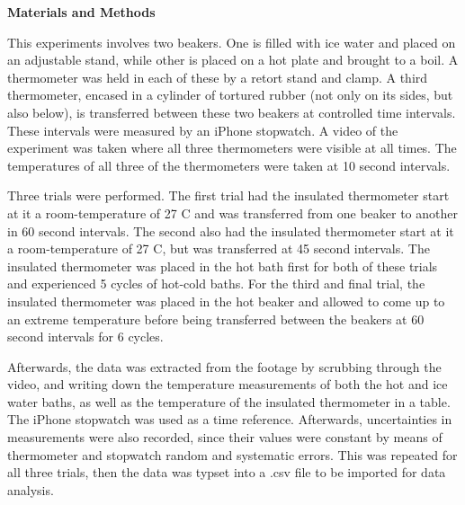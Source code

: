 \documentclass[11pt]{article}
\begin{document}
\begin{multicols}{2}
    \vspace{20pt}

     \selectfont \textbf{Materials and Methods}
    
     \selectfont 


    This experiments involves two beakers. One is filled with ice water and placed on an adjustable stand, while other is placed on a hot plate and brought to a boil. A thermometer was held in each of these by a retort stand and clamp. A third thermometer, encased in a cylinder of tortured rubber (not only on its sides, but also below), is transferred between these two beakers at controlled time intervals. These intervals were measured by an iPhone stopwatch. A video of the experiment was taken where all three thermometers were visible at all times. The temperatures of all three of the thermometers were taken at 10 second intervals.
    
    Three trials were performed. The first trial had the insulated thermometer start at it a room-temperature of 27 \textdegree C and was transferred from one beaker to another in 60 second intervals. The second also had the insulated thermometer start at it a room-temperature of 27 \textdegree C, but was transferred at 45 second intervals. The insulated thermometer was placed in the hot bath first for both of these trials and experienced 5 cycles of hot-cold baths. For the third and final trial, the insulated thermometer was placed in the hot beaker and allowed to come up to an extreme temperature before being transferred between the beakers at 60 second intervals for 6 cycles.

    Afterwards, the data was extracted from the footage by scrubbing through the video, and writing down the temperature measurements of both the hot and ice water baths, as well as the temperature of the insulated thermometer in a table. The iPhone stopwatch was used as a time reference. Afterwards, uncertainties in measurements were also recorded, since their values were constant by means of thermometer and stopwatch random and systematic errors. This was repeated for all three trials, then the data was typset into a .csv file to be imported for data analysis.




\end{multicols}
\end{document}
